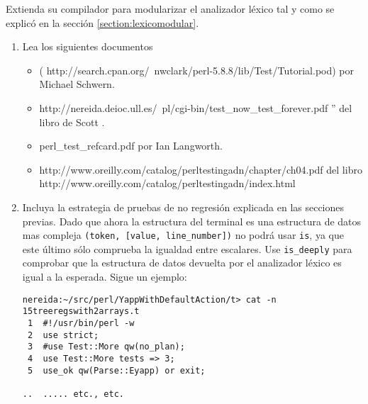 \label{practica:pruebaslexico}
Extienda su compilador para modularizar el analizador léxico
tal y como se explicó en la sección
\ref{section:lexicomodular}.
\begin{enumerate}
\item
Lea  los siguientes documentos
\begin{itemize}
\item
{} 
(
{http://search.cpan.org/~nwclark/perl-5.8.8/lib/Test/Tutorial.pod})
por Michael Schwern. 

\item
{}
{http://nereida.deioc.ull.es/~pl/cgi-bin/test_now_test_forever.pdf}
'' del libro de Scott \cite{scott}.


\item
{}
{perl_test_refcard.pdf}
por Ian Langworth. 

\item
{}
{http://www.oreilly.com/catalog/perltestingadn/chapter/ch04.pdf}
del libro 
{http://www.oreilly.com/catalog/perltestingadn/index.html}

\end{itemize}

\item
Incluya la estrategia de pruebas de no regresión explicada en las secciones previas.
Dado que ahora la estructura del terminal es una estructura de datos mas compleja
\verb|(token, [value, line_number])| no podrá usar \verb|is|, ya que este último sólo 
comprueba la igualdad entre escalares.
Use \verb|is_deeply| para comprobar que la estructura de datos devuelta por el
analizador léxico es igual a la esperada. Sigue un ejemplo:

\begin{verbatim}
nereida:~/src/perl/YappWithDefaultAction/t> cat -n  15treeregswith2arrays.t
 1  #!/usr/bin/perl -w
 2  use strict;
 3  #use Test::More qw(no_plan);
 4  use Test::More tests => 3;
 5  use_ok qw(Parse::Eyapp) or exit;

..  ..... etc., etc.


\end{verbatim}
\end{enumerate}
